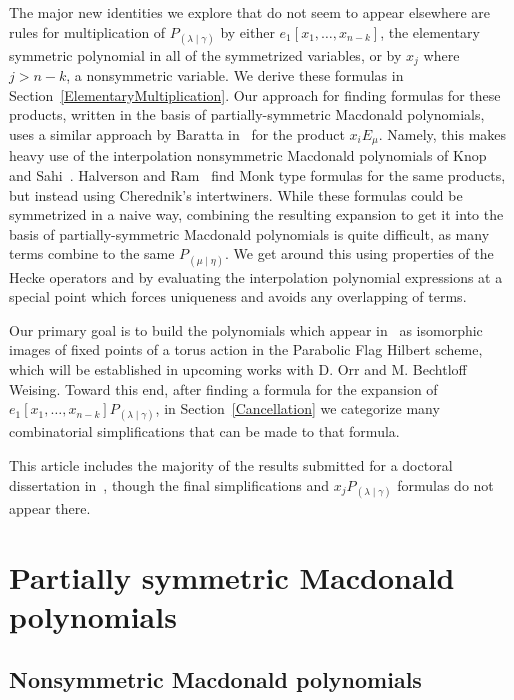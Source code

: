 \documentclass[ALCO]{cedram}
\newcommand{\PP}{P_{(\lambda \mid \gamma)}}
\newcommand{\mueta}{{(\mu \mid \eta)}}
\begin{document}
The major new identities we explore that do not seem to appear elsewhere are rules for multiplication of $\PP$ by either $e_1[x_1, \dotsc, x_{n-k}]$, the elementary symmetric polynomial in all of the symmetrized variables, or by $x_j$ where $j>n-k$, a nonsymmetric variable. We derive these formulas in Section~\ref{ElementaryMultiplication}. Our approach for finding formulas for these products, written in the basis of partially-symmetric Macdonald polynomials, uses a similar approach by Baratta in~\cite{MR2525842} for the product $x_i E_\mu$. Namely, this makes heavy use of the interpolation nonsymmetric Macdonald polynomials of Knop~\cite{MR1456318} and Sahi~\cite{MR1399411}. Halverson and Ram~\cite{MR4756478} find Monk type formulas for the same products, but instead using Cherednik's intertwiners. While these formulas could be symmetrized in a naive way, combining the resulting expansion to get it into the basis of partially-symmetric Macdonald polynomials is quite difficult, as many terms combine to the same $P_{\mueta}$. We get around this using properties of the Hecke operators and by evaluating the interpolation polynomial expressions at a special point which forces uniqueness and avoids any overlapping of terms.

Our primary goal is to build the polynomials which appear in~\cite{MR4081116} as isomorphic images of fixed points of a torus action in the Parabolic Flag Hilbert scheme, which will be established in upcoming works with D. Orr and M. Bechtloff Weising. Toward this end, after finding a formula for the expansion of $e_1[x_1, \dotsc, x_{n-k}] \PP$, in Section~\ref{Cancellation} we categorize many combinatorial simplifications that can be made to that formula.

This article includes the majority of the results submitted for a doctoral dissertation in~\cite{Dissertation}, though the final simplifications and $x_j \PP$ formulas do not appear there.



\section{Partially symmetric Macdonald polynomials}

\subsection{Nonsymmetric Macdonald polynomials}
\end{document}
